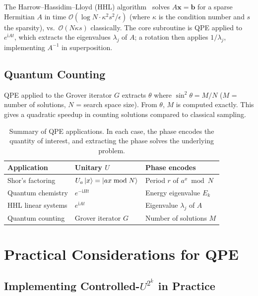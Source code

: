 \documentclass[12pt,a4paper]{article}
\newcommand{\QPE}{\textsc{QPE}}
\newcommand{\ii}{\mathrm{i}}
\newcommand{\bigO}{\mathcal{O}}
\renewcommand{\vec}[1]{\boldsymbol{#1}}
\begin{document}
The Harrow--Hassidim--Lloyd (HHL) algorithm~\cite{harrow2009} solves
$A\vec{x}=\vec{b}$ for a sparse Hermitian $A$ in time
$\bigO(\log N \cdot \kappa^2 s^2 / \epsilon)$ (where $\kappa$ is the condition
number and $s$ the sparsity), vs.\ $\bigO(N\kappa s)$ classically.  The
core subroutine is \QPE{} applied to $e^{\ii At}$, which extracts the
eigenvalues $\lambda_j$ of $A$; a rotation then applies $1/\lambda_j$,
implementing $A^{-1}$ in superposition.

\subsection{Quantum Counting}

\QPE{} applied to the Grover iterator $G$ extracts $\theta$ where
$\sin^2\theta = M/N$ ($M$ = number of solutions, $N$ = search space size).
From $\theta$, $M$ is computed exactly.  This gives a quadratic speedup
in counting solutions compared to classical sampling.

\begin{table}[ht]
\centering
\caption{Summary of QPE applications.  In each case, the phase encodes the
  quantity of interest, and extracting the phase solves the underlying problem.}
\begin{tabular}{@{}lll@{}}
\toprule
\textbf{Application} & \textbf{Unitary $U$} & \textbf{Phase encodes} \\
\midrule
Shor's factoring & $U_a\Ket{x}=\Ket{ax\bmod N}$ & Period $r$ of $a^x\bmod N$ \\
Quantum chemistry & $e^{-\ii Ht}$ & Energy eigenvalue $E_k$ \\
HHL linear systems & $e^{\ii At}$ & Eigenvalue $\lambda_j$ of $A$ \\
Quantum counting & Grover iterator $G$ & Number of solutions $M$ \\
\bottomrule
\end{tabular}
\end{table}

\newpage

\section{Practical Considerations for QPE}
\label{sec:practical}

\subsection{Implementing Controlled-\texorpdfstring{$U^{2^k}$}{U\^{}2\^{}k} in Practice}
\end{document}
